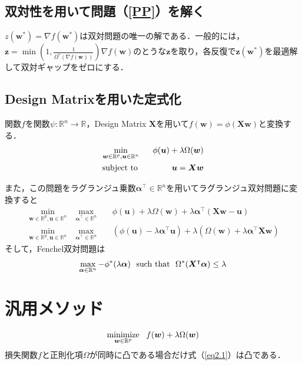 \documentclass[a4paper,11pt]{jsarticle}
\numberwithin{theorem}{section}  %
\numberwithin{equation}{section} %
\newcommand{\st}{\mathop{\rm subject~to\,}\limits}
\newcommand{\minimize}{\mathop{\mathrm{\rm minimize}}\limits}
\begin{document}
\subsection{双対性を用いて問題（\ref{PP}）を解く}
$z(\bm{w}^*) = \nabla f(\bm{w}^*)$は双対問題の唯一の解である．一般的には，$\bm{z}=\min(1,\frac{1}{\Omega^*(\nabla f (\bm{w}))})\nabla f(\bm{w})$のとうな$\bm{z}$を取り，各反復で$\bm{z}(\bm{w}^*)$を最適解して双対ギャップをゼロにする．


\subsection{Design Matrixを用いた定式化}
関数$f$を関数$\psi:\mathbb{R}^n \to \mathbb{R}$，Design Matrix $\bm{X}$を用いて$f(\bm{w}) = \phi(\bm{Xw})$と変換する．
\begin{eqnarray}
\min_{\bm{w} \in \mathbb{R}^p,\bm{u} \in \mathbb{R}^n} &\,\,\,\,& \phi(\bm{u}) + \lambda \Omega(\bm{w}) \\
\st &\,\,\,\,& \bm{u} = \bm{X}\bm{w}
\end{eqnarray}

また，この問題をラグランジュ乗数$\bm{\alpha}^\intercal  \in \mathbb{R}^n$を用いてラグランジュ双対問題に変換すると
\begin{eqnarray}
\min_{\bm{w}\in\mathbb{R}^p,\bm{u} \in \mathbb{R}^n} \,\,\, \max_{\bm{\alpha}^\intercal  \in \mathbb{R}^n} && \phi(\bm{u}) + \lambda \Omega(\bm{w}) + \lambda \bm{\alpha}^\intercal  (\bm{X}\bm{w}-\bm{u}) \\
\min_{\bm{w}\in\mathbb{R}^p,\bm{u} \in \mathbb{R}^n} \,\,\, \max_{\bm{\alpha}^\intercal  \in \mathbb{R}^n} && (\phi(\bm{u}) - \lambda\bm{\alpha}^\intercal \bm{u}) + \lambda (\Omega(\bm{w}) +   \lambda\bm{\alpha}^\intercal \bm{X}\bm{w})
\end{eqnarray}
そして，Fenchel双対問題は
\begin{eqnarray}
\max_{\bm{\alpha} \in \mathbb{R}^n} -\phi^*(\lambda \bm{\alpha}) \text{\,\,\,\,such that\,\,\,\,} \Omega^*(\bm{X}^\intercal  \bm{\alpha}) \le \lambda
\end{eqnarray}

\section{汎用メソッド}

\begin{equation}
\minimize_{\bm{w} \in \mathbb{R}^p}\,\,\,\, f(\bm{w}) + \lambda \Omega(\bm{w})
\label{eq2.1}
\end{equation}
損失関数$f$と正則化項$\Omega$が同時に凸である場合だけ式（\ref{eq2.1}）は凸である．
\end{document}
